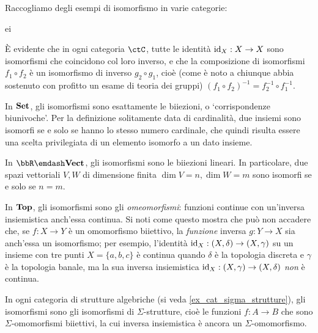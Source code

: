 \begin{examples}
	Raccogliamo degli esempi di isomorfismo in varie categorie:%
	\begin{enumtag}{ei}
		\item \`E evidente che in ogni categoria \(\ctC\), tutte le identità \(\mathrm{id}_X : X\to X\) sono isomorfismi che coincidono col loro inverso, e che la composizione di isomorfismi \(f_1\circ f_2\) è un isomorfismo di inverso \(g_2\circ g_1\), cioè (come è noto a chiunque abbia sostenuto con profitto un esame di teoria dei gruppi) \((f_1\circ f_2)^{-1} = f_2^{-1}\circ f_1^{-1}\).
		\item In \(\mathbf{Set}\), gli isomorfismi sono esattamente le biiezioni, o `corrispondenze biunivoche'. Per la definizione solitamente data di cardinalità, due insiemi sono isomorfi se e solo se hanno lo stesso numero cardinale, che quindi risulta essere una scelta privilegiata di un elemento isomorfo a un dato insieme.
		\item In \(\bbR\emdash\ctVect\), gli isomorfismi sono le biiezioni lineari. In particolare, due spazi vettoriali \(V,W\) di dimensione finita \(\dim V=n,\dim W=m\) sono isomorfi se e solo se \(n=m\).
		\item In \(\mathbf{Top}\), gli isomorfismi sono gli \emph{omeomorfismi}: funzioni continue con un'inversa insiemistica anch'essa continua. Si noti come questo mostra che può non accadere che, se \(f : X\to Y\) è un omomorfismo biiettivo, la \emph{funzione} inversa \(g : Y\to X\) sia anch'essa un isomorfismo; per esempio, l'identità \(\mathrm{id}_X : (X,\delta)\to (X,\gamma)\) su un insieme con tre punti \(X=\{a,b,c\}\) è continua quando \(\delta\) è la topologia discreta e \(\gamma\) è la topologia banale, ma la sua inversa insiemistica \(\mathrm{id}_X : (X,\gamma)\to(X,\delta)\) \emph{non} è continua.
		\item In ogni categoria di strutture algebriche (si veda \ref{ex_cat_sigma_strutture}), gli isomorfismi sono gli isomorfismi di \(\Sigma\)-strutture, cioè le funzioni \(f : A\to B\) che sono \(\Sigma\)-omomorfismi biiettivi, la cui inversa insiemistica è ancora un \(\Sigma\)-omomorfismo.
	\end{enumtag}
\end{examples}
